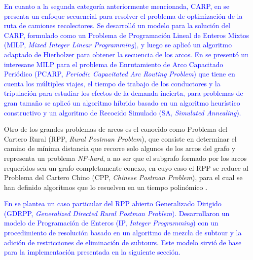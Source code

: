 \documentclass[spanish, conference]{IEEEtran}
\begin{document}
{%
\textcolor{blue}{En cuanto a la segunda categoría anteriormente mencionada, CARP, en \cite{Vecchi2016ACollection} se presenta un enfoque secuencial para resolver el problema de optimización de la ruta de camiones recolectores. Se desarrolló un modelo para la solución del CARP, formulado como un Problema de Programación Lineal de Enteros Mixtos (MILP, \textit{Mixed Integer Linear Programming}), y luego se aplicó un algoritmo adaptado de Hierholzer para obtener la secuencia de los arcos. En \cite{Tirkolaee2018ATime} se presentó un interesane MILP para el problema de Enrutamiento de Arco Capacitado Periódico (PCARP, \textit{Periodic Capacitated Arc Routing Problem}) que tiene en cuenta los múltiples viajes, el tiempo de trabajo de los conductores y la tripulación para estudiar los efectos de la demanda incierta, para problemas de gran tamaño se aplicó un algoritmo híbrido basado en un algoritmo heurístico constructivo y un algoritmo de Recocido Simulado (SA, \textit{Simulated Annealing}). }

Otro de los grandes problemas de arcos es el conocido como Problema del Cartero Rural (RPP, \textit{Rural Postman Problem}), que consiste en determinar el camino de mínima distancia que recorre solo algunos de los arcos del grafo y representa un problema \textit{NP-hard}, a no ser que el subgrafo formado por los arcos requeridos sea un grafo completamente conexo, en cuyo caso el RPP se reduce al Problema del Cartero Chino (CPP, \textit{Chinese Postman Problem}), para el cual se han definido algoritmos que lo resuelven en un tiempo polinómico \cite{CalvinoM2011CooperacionPanoramica}. 

\textcolor{blue}{En \cite{Braier2017AnArgentina} se plantea un caso particular del RPP abierto Generalizado Dirigido (GDRPP, \textit{Generalized Directed Rural Postman Problem}). Desarrollaron un modelo de Programación de Enteros (IP, \textit{Integer Programming}) con un procedimiento de resolución basado en un algoritmo de mezcla de subtour y la adición de restricciones de eliminación de subtours. Este modelo sirvió de base para la implementación presentada en la siguiente sección.}

}
\end{document}
